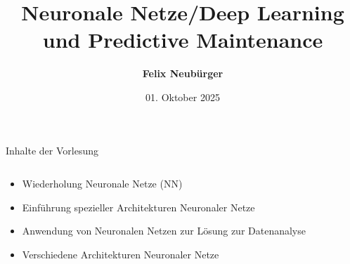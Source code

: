 \documentclass[aspectratio=1610, xcolor=dvipsnames, 9pt]{beamer}
\title{Neuronale Netze/Deep Learning und Predictive Maintenance}
\author[F.~Neubürger,]{ \textbf{Felix Neubürger}}
\institute[I \& W]{Fachhochschule Südwestfalen, Ingenieurs- \& Wirtschaftswissenschaften}
\date{01. Oktober 2025}
\begin{document}
\begin{frame}{Inhalte der Vorlesung}
  \begin{columns}
    \begin{column}{1\textwidth}
      \begin{itemize}
        \item Wiederholung Neuronale Netze (NN)\newline
        \item Einführung spezieller Architekturen Neuronaler Netze \newline
        \item Anwendung von Neuronalen Netzen zur Lösung zur Datenanalyse  \newline
        \item Verschiedene Architekturen Neuronaler Netze \newline 
      \end{itemize}
    \end{column}
    \begin{column}{0\textwidth}
    \end{column}
  \end{columns}
\end{frame}
\end{document}
